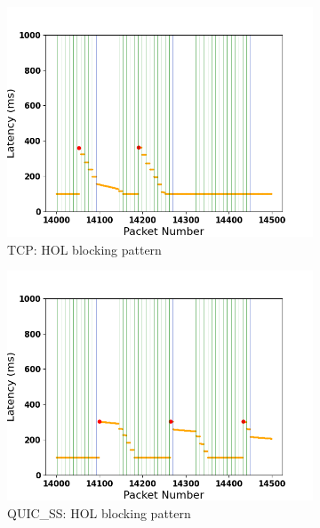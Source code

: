 \documentclass{mpaper}
\begin{document}
\begin{figure}
  \centering
  \begin{subfigure}[b]{0.32\textwidth}
      \centering
      \includegraphics[width=\textwidth]{SAL/TCP_Stack_Latency_Available.png}
      \caption{TCP: HOL blocking pattern}
      \label{fig:TSA}
  \end{subfigure}
  \hfill
  \begin{subfigure}[b]{0.32\textwidth}
      \centering
      \includegraphics[width=\textwidth]{SAL/QUIC_SS_Stack_Latency_Available.png}
      \caption{QUIC\_SS: HOL blocking pattern}
      \label{fig:SSSA}
  \end{subfigure}
  \hfill
  \begin{subfigure}[b]{0.32\textwidth}

\end{subfigure}
\end{figure}
\end{document}
